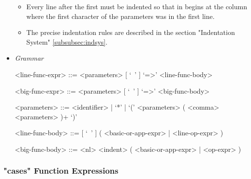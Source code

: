 \documentclass{article}
\begin{document}
\begin{itemize}
\begin{itemize}
\item
Every line after the first must be indented so that in begins at the column 
where the first character of the parameters was in the first line.

\item
The precise indentation rules are described in the section
"Indentation System" \ref{subsubsec:indsys}.
\end{itemize}

\item \textit{Grammar}
\begin{grammar}
<line-func-expr> ::= <parameters> [ `\ ' ] `=>' <line-func-body>

<big-func-expr> ::= <parameters> [ `\ ' ] `=>' <big-func-body>

<parameters> ::= <identifier> | `*' | `(' <parameters> ( <comma> <parameters> )+ `)'

<line-func-body> ::= [ `\ ' ] ( <basic-or-app-expr> | <line-op-expr> )

<big-func-body> ::= <nl> <indent> ( <basic-or-app-expr> | <op-expr> )
\end{grammar}
\end{itemize}

\subsubsection{"cases" Function Expressions}
\label{subsubsec:casessyntax}
\end{document}
